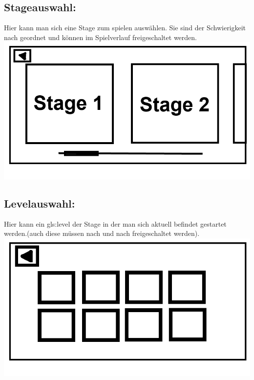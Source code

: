 \documentclass{scrartcl}
\begin{document}
\begin{enumerate}
\begin{minipage}{1\textwidth}
	\end{minipage}
	
	\begin{minipage}{1\textwidth}
		\item \subsection*{Stageauswahl:}
		Hier kann man sich eine Stage zum spielen auswählen. Sie sind der Schwierigkeit nach geordnet und können im Spielverlauf freigeschaltet werden.\\
		\includegraphics[scale=0.5]{assets/Stagemenu}
	\end{minipage}
	
	\begin{minipage}{1\textwidth}
		\item \subsection*{Levelauswahl:} \label{appaufbau:Levelauswahl}
		Hier kann ein \gls{gls:level} der Stage in der man sich aktuell befindet gestartet werden.(auch diese müssen nach und nach freigeschaltet werden).\\
		\includegraphics[scale=0.5]{assets/Levelmenu}
	\end{minipage}
	

\end{enumerate}
\end{document}
